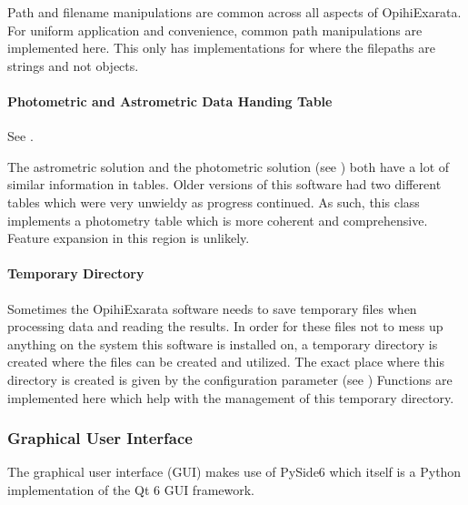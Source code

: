 \documentclass[letterpaper,11pt,english]{sphinxmanual}
\begin{document}
\sphinxAtStartPar
Path and filename manipulations are common across all aspects of OpihiExarata.
For uniform application and convenience, common path manipulations are
implemented here. This only has implementations for where the filepaths are
strings and not objects.


\paragraph{Photometric and Astrometric Data Handing Table}
\label{\detokenize{technical/architecture/library:photometric-and-astrometric-data-handing-table}}
\sphinxAtStartPar
See {\hyperref[\detokenize{code/opihiexarata.library.phototable:module-opihiexarata.library.phototable}]{}}.

\sphinxAtStartPar
The astrometric solution and the photometric solution
(see {\hyperref[\detokenize{technical/architecture/vehicles_solutions:technical-architecture-vehicles-solutions}]{}}) both have a lot of
similar information in tables. Older versions of this software had two
different tables which were very unwieldy as progress continued. As such,
this class implements a photometry table which is more coherent and
comprehensive. Feature expansion in this region is unlikely.


\paragraph{Temporary Directory}
\label{\detokenize{technical/architecture/library:temporary-directory}}
\sphinxAtStartPar
Sometimes the OpihiExarata software needs to save temporary files when
processing data and reading the results. In order for these files not to
mess up anything on the system this software is installed on, a temporary
directory is created where the files can be created and utilized. The exact
place where this directory is created is given by the configuration parameter
 (see {\hyperref[\detokenize{user/configuration:user-configuration}]{}}) Functions are
implemented here which help with the management of this temporary directory.

\sphinxstepscope


\subsubsection{Graphical User Interface}
\label{\detokenize{technical/architecture/graphical_user_interface:graphical-user-interface}}\label{\detokenize{technical/architecture/graphical_user_interface:technical-architecture-graphical-user-interface}}\label{\detokenize{technical/architecture/graphical_user_interface::doc}}
\sphinxAtStartPar
The graphical user interface (GUI) makes use of PySide6 which itself is a
Python implementation of the Qt 6 GUI framework.
\end{document}
